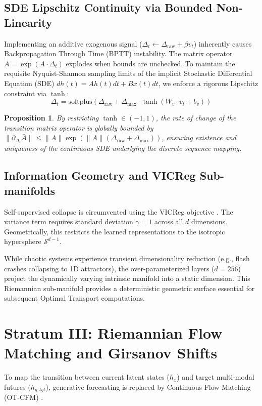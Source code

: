 \documentclass[11pt]{article}
\newtheorem{proposition}[theorem]{Proposition}
\newcommand{\softplus}{\mathrm{softplus}}
\begin{document}
\subsection{SDE Lipschitz Continuity via Bounded Non-Linearity}
Implementing an additive exogenous signal ($\Delta_t \leftarrow \Delta_\text{raw} + \beta v_t$) inherently causes Backpropagation Through Time (BPTT) instability. The matrix operator $\bar{A} = \exp(A \cdot \Delta_t)$ explodes when bounds are unchecked.
To maintain the requisite Nyquist-Shannon sampling limits of the implicit Stochastic Differential Equation (SDE) $dh(t) = A h(t)dt + B x(t)dt$, we enforce a rigorous Lipschitz constraint via $\tanh$:
\begin{equation}
  \Delta_t = \softplus\!\left(\Delta_\text{raw} + \Delta_\text{max} \cdot \tanh(W_v \cdot v_t + b_v)\right)
\end{equation}
\begin{proposition}
By restricting $\tanh \in (-1, 1)$, the rate of change of the transition matrix operator is globally bounded by $\|\partial_{\Delta_t} \bar{A}\| \le \|A\| \exp(\|A\|(\Delta_\text{raw} + \Delta_\text{max}))$, ensuring existence and uniqueness of the continuous SDE underlying the discrete sequence mapping.
\end{proposition}

\subsection{Information Geometry and VICReg Sub-manifolds}
Self-supervised collapse is circumvented using the VICReg objective \cite{bardes2022vicreg}. The variance term requires standard deviation $\gamma=1$ across all $d$ dimensions. Geometrically, this restricts the learned representations to the isotropic hypersphere $\mathcal{S}^{d-1}$.

While chaotic systems experience transient dimensionality reduction (e.g., flash crashes collapsing to 1D attractors), the over-parameterized layers ($d=256$) project the dynamically varying intrinsic manifold into a static dimension. This Riemannian sub-manifold provides a deterministic geometric surface essential for subsequent Optimal Transport computations.

\section{Stratum III: Riemannian Flow Matching and Girsanov Shifts}

To map the transition between current latent states ($h_x$) and target multi-modal futures ($h_{y,tgt}$), generative forecasting is replaced by Continuous Flow Matching (OT-CFM) \cite{lipman2022, tong2023otcfm}. 
\end{document}
